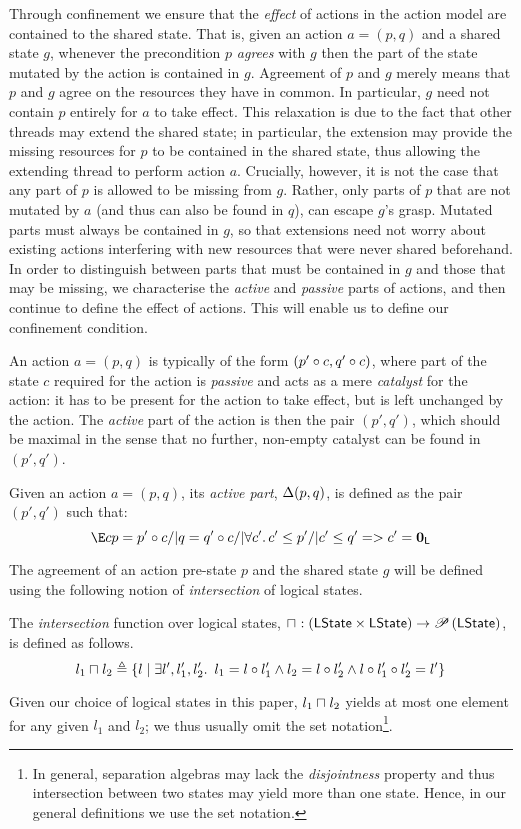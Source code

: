 Through confinement we ensure that the \emph{effect} of actions in the action model are contained to the shared state. That is, given an action $a = (p,q)$ and a shared state $g$, whenever the precondition $p$ \emph{agrees} with $g$ then the part of the state mutated by the action is contained in $g$. 
Agreement of $p$ and $g$ merely means that $p$ and $g$ agree on the resources they have in common. 
In particular, $g$ need not contain $p$ entirely for $a$ to take effect. This relaxation is due to the fact that other threads may extend the shared state; in particular, the extension may provide the missing resources for $p$ to be contained in the shared state, thus allowing the extending thread to perform action $a$. Crucially, however, it is not the case that any part of $p$ is allowed to be missing from $g$. Rather, only parts of $p$ that are not mutated by $a$ (and thus can also be found in $q$), can escape $g$'s grasp. Mutated parts must always be contained in $g$, so that extensions need not worry about existing actions interfering with new resources that were never shared beforehand. In order to distinguish between parts that must be contained in $g$ and those that may be missing, we characterise the \emph{active} and \emph{passive} parts of actions, and then continue to define the effect of actions. This will enable us to define our confinement condition.

An action $a = (p, q)$ is typically of the form $(p' \circ c, q' \circ c)$, where part of the state $c$ required for the action is \emph{passive} and acts as a mere \emph{catalyst} for the action: it has to be present for the action to take effect, but is left unchanged by the action. The \emph{active} part of the action is then the pair $(p',q')$, which should be maximal in the sense that no further, non-empty catalyst can be found in $(p',q')$.
%
%
\begin{definition}
Given an action $a = (p, q)$, its \emph{active part}, $\Delta {(p,q)}$, is defined as the pair $(p', q')$ such that:
%
\[
	\E c p = p' \composeL c /| q = q' \composeL c /| \V{c'} c'\leq p' /|
  c'\leq q' => c' = \unitL
\]
%
\end{definition}
%
%
%
The agreement of an action pre-state $p$ and the shared state $g$ will be defined using the following notion of \emph{intersection} of logical states.
%
%
\begin{definition}[Intersection]
The \emph{intersection} function over logical states,
$
\sqcap_{} : \left(\mathsf{LState} \times \mathsf{LState} \right) \rightarrow \mathscr{P}\left(\mathsf{LState} \right)
$, is defined as follows.
%
\[
	l_1 \sqcap_{} l_2 \triangleq 
	\left\{ 
		l  \mid
		\exists l', l_1', l_2'.\,\ l_1 = l \circ l_1' \land l_2 = l \circ l_2' \land l \circ l_1' \circ l_2' = l'
	\right\}
\]
%
\end{definition}
%
Given our choice of logical states in this paper, $l_1\sqcap_{} l_2$ yields at most one element for any given $l_1$ and $l_2$; we thus usually omit the set notation\footnote{In general, separation algebras may lack the \emph{disjointness} property and thus intersection between two states may yield more than one state. Hence, in our general definitions we use the set notation.}.

